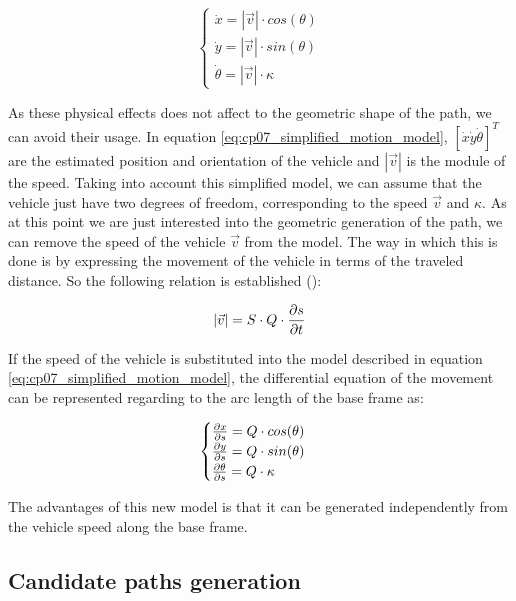 \begin{equation}\label{eq:cp07_simplified_motion_model}
\begin{cases}
\dot{x} = |\vec{v}| \cdot cos(\theta) \\
\dot{y} = |\vec{v}| \cdot sin(\theta) \\
\dot{\theta} = |\vec{v}| \cdot \kappa
\end{cases}
\end{equation}

As these physical effects does not affect to the geometric shape of the path, we can avoid their usage. In equation \ref{eq:cp07_simplified_motion_model}, $[\dot{x} \dot{y} \dot{\theta} ]^T$ are the estimated position and orientation of the vehicle and $|\vec{v}|$ is the module of the speed. Taking into account this simplified model, we can assume that the vehicle just have two degrees of freedom, corresponding to the speed $\vec{v}$ and $\kappa$. As at this point we are just interested into the geometric generation of the path, we can remove the speed of the vehicle $\vec{v}$ from the model. The way in which this is done is by expressing the movement of the vehicle in terms of the traveled distance. So the following relation is established (\cite{chu2012local}):

\begin{equation}\label{eq:cp07_speed_to_distance}
|\vec{v}| = S \cdot Q \cdot { {\partial s} \over {\partial t}}
\end{equation}

If the speed of the vehicle is substituted into the model described in equation \ref{eq:cp07_simplified_motion_model}, the differential equation of the movement can be represented regarding to the arc length of the base frame as:

\begin{equation}\label{eq:cp07_motion_model_in_distance_terms}
\begin{cases}
{{\partial x} \over {\partial s}} = Q \cdot cos(\theta) \\
{{\partial y} \over {\partial s}} = Q \cdot sin(\theta) \\
{{\partial \theta} \over {\partial s}} = Q \cdot \kappa
\end{cases}
\end{equation}

The advantages of this new model is that it can be generated independently from the vehicle speed along the base frame.

\subsection{Candidate paths generation}\label{ch:chapter07_01_03}

